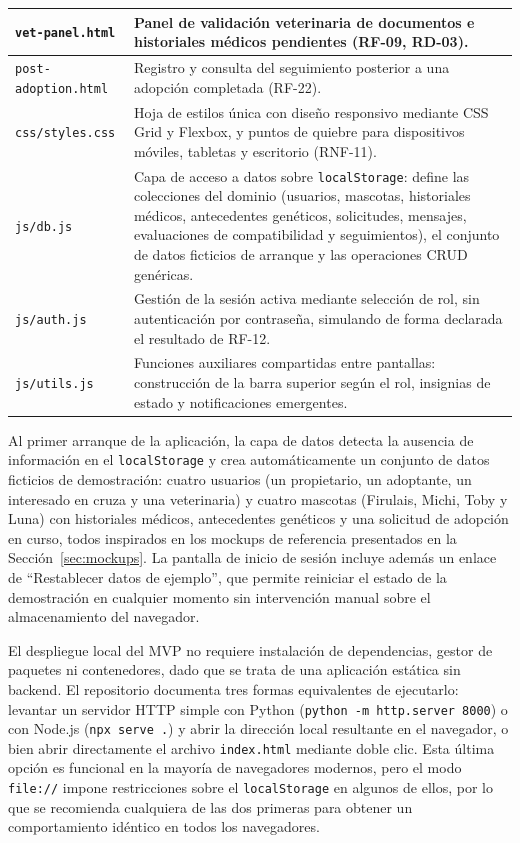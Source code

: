 \documentclass[journal,onecolumn]{IEEEtran}
\begin{document}
\begin{longtable}{@{}p{4.2cm} p{10.6cm}@{}}
		\hline
		\texttt{vet-panel.html} & Panel de validación veterinaria de documentos e historiales médicos pendientes (RF-09, RD-03). \\
		\hline
		\texttt{post-adoption.html} & Registro y consulta del seguimiento posterior a una adopción completada (RF-22). \\
		\hline
		\texttt{css/styles.css} & Hoja de estilos única con diseño responsivo mediante CSS Grid y Flexbox, y puntos de quiebre para dispositivos móviles, tabletas y escritorio (RNF-11). \\
		\hline
		\texttt{js/db.js} & Capa de acceso a datos sobre \texttt{localStorage}: define las colecciones del dominio (usuarios, mascotas, historiales médicos, antecedentes genéticos, solicitudes, mensajes, evaluaciones de compatibilidad y seguimientos), el conjunto de datos ficticios de arranque y las operaciones CRUD genéricas. \\
		\hline
		\texttt{js/auth.js} & Gestión de la sesión activa mediante selección de rol, sin autenticación por contraseña, simulando de forma declarada el resultado de RF-12. \\
		\hline
		\texttt{js/utils.js} & Funciones auxiliares compartidas entre pantallas: construcción de la barra superior según el rol, insignias de estado y notificaciones emergentes. \\
	\end{longtable}
	
	Al primer arranque de la aplicación, la capa de datos detecta la ausencia de
	información en el \texttt{localStorage} y crea automáticamente un conjunto
	de datos ficticios de demostración: cuatro usuarios (un propietario, un
	adoptante, un interesado en cruza y una veterinaria) y cuatro mascotas
	(Firulais, Michi, Toby y Luna) con historiales médicos, antecedentes
	genéticos y una solicitud de adopción en curso, todos inspirados en los
	mockups de referencia presentados en la
	Sección~\ref{sec:mockups}. La pantalla de inicio de sesión incluye
	además un enlace de \enquote{Restablecer datos de ejemplo}, que permite
	reiniciar el estado de la demostración en cualquier momento sin intervención
	manual sobre el almacenamiento del navegador.
	
	El despliegue local del MVP no requiere instalación de dependencias, gestor
	de paquetes ni contenedores, dado que se trata de una aplicación estática
	sin backend. El repositorio documenta tres formas equivalentes de
	ejecutarlo: levantar un servidor HTTP simple con Python
	(\texttt{python -m http.server 8000}) o con Node.js (\texttt{npx serve .})
	y abrir la dirección local resultante en el navegador, o bien abrir
	directamente el archivo \texttt{index.html} mediante doble clic. Esta
	última opción es funcional en la mayoría de navegadores modernos, pero el
	modo \texttt{file://} impone restricciones sobre el \texttt{localStorage} en
	algunos de ellos, por lo que se recomienda cualquiera de las dos primeras
	para obtener un comportamiento idéntico en todos los navegadores.
	
\end{document}
